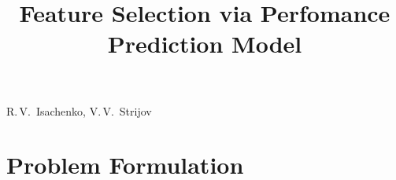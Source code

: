 \documentclass[12pt,twoside]{article}
\theoremstyle{definition}
\begin{document}
	
	\title{Feature Selection via Perfomance Prediction Model}
\date{}
\maketitle
\begin{center}
	R.\,V.~Isachenko,
	V.\,V.~Strijov
\end{center}

\section{Problem Formulation}
\end{document}
